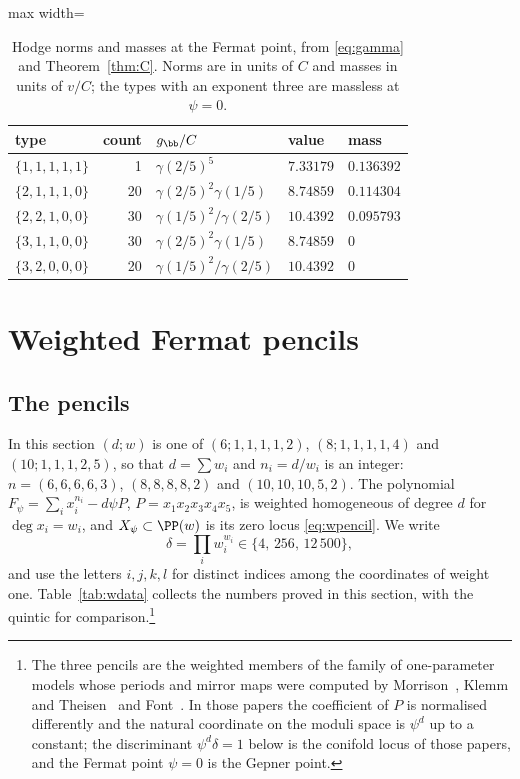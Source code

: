 \begin{table}[t]
\caption{Hodge norms and masses at the Fermat point, from
\eqref{eq:gamma} and Theorem~\ref{thm:C}. Norms are in units of $C$ and
masses in units of $v/C$; the types with an exponent three are massless at
$\psi=0$.}
\label{tab:fermat}
\centering
\begin{adjustbox}{max width=\linewidth}\begin{tabular}{lrlll}
\toprule
type & count & $g_{\bb}/C$ & value & mass\\
\midrule
$\{1,1,1,1,1\}$ & 1 & $\gamma(2/5)^5$ & $7.33179$ & $0.136392$\\
$\{2,1,1,1,0\}$ & 20 & $\gamma(2/5)^2\gamma(1/5)$ & $8.74859$ & $0.114304$\\
$\{2,2,1,0,0\}$ & 30 & $\gamma(1/5)^2/\gamma(2/5)$ & $10.4392$ & $0.095793$\\
$\{3,1,1,0,0\}$ & 30 & $\gamma(2/5)^2\gamma(1/5)$ & $8.74859$ & $0$\\
$\{3,2,0,0,0\}$ & 20 & $\gamma(1/5)^2/\gamma(2/5)$ & $10.4392$ & $0$\\
\bottomrule
\end{tabular}\end{adjustbox}
\end{table}

\section{Weighted Fermat pencils}\label{sec:weighted}

\subsection{The pencils}

In this section $(d;w)$ is one of $(6;1,1,1,1,2)$, $(8;1,1,1,1,4)$ and
$(10;1,1,1,2,5)$, so that $d=\sum w_i$ and $n_i=d/w_i$ is an integer:
$n=(6,6,6,6,3)$, $(8,8,8,8,2)$ and $(10,10,10,5,2)$. The polynomial
$F_\psi=\sum_ix_i^{n_i}-d\psi P$, $P=x_1x_2x_3x_4x_5$, is weighted
homogeneous of degree $d$ for $\deg x_i=w_i$, and $X_\psi\subset\PP(w)$ is
its zero locus \eqref{eq:wpencil}. We write
\[
\delta=\prod_iw_i^{w_i}\in\{4,\,256,\,12\,500\},
\]
and use the letters $i,j,k,l$ for distinct indices among the coordinates of
weight one. Table~\ref{tab:wdata} collects the numbers proved in this
section, with the quintic for comparison.\footnote{The three pencils are the
weighted members of the family of one-parameter models whose periods and
mirror maps were computed by Morrison~\cite{Mor92}, Klemm and
Theisen~\cite{KT93} and Font~\cite{Fon93}. In those papers the coefficient
of $P$ is normalised differently and the natural coordinate on the moduli
space is $\psi^d$ up to a constant; the discriminant $\psi^d\delta=1$ below
is the conifold locus of those papers, and the Fermat point $\psi=0$ is the
Gepner point.}

